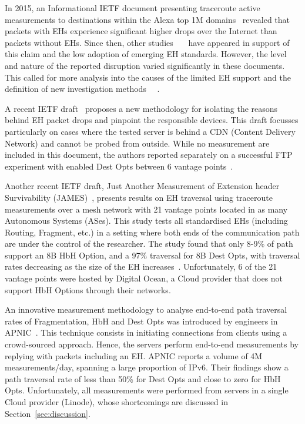 \documentclass[conference]{IEEEtran}
\begin{document}
In 2015, an Informational IETF document presenting traceroute active
measurements to destinations within the Alexa top 1M domains~\cite{RFC7872}
revealed that packets with EHs experience significant higher drops over the
Internet than packets without EHs. Since then, other
studies~\cite{james}~\cite{nalini-iepg114}~\cite{apnic} have appeared in
support of this claim and the low adoption of emerging EH standards.  However,
the level and nature of the reported disruption varied significantly in these
documents.  This called for more analysis into the causes of the limited EH
support and the definition of new investigation methods
~\cite{james}~\cite{elkins-v6ops-eh-deepdive-fw-01}.  

A recent IETF draft~\cite{elkins-v6ops-eh-deepdive-fw-01} proposes a new
methodology for isolating the reasons behind EH packet drops and pinpoint the
responsible devices. This draft focusses particularly on cases where the tested
server is behind a CDN (Content Delivery Network) and cannot be probed from
outside.  While no measurement are included in this document, the authors
reported separately on a successful FTP experiment with enabled Dest Opts
between 6 vantage points~\cite{nalini-iepg114}.

Another recent IETF draft, Just Another Measurement of Extension header
Survivability (JAMES)~\cite{james}, presents results on EH traversal using
traceroute measurements over a mesh network with 21 vantage points located in
as many Autonomous Systems (ASes). This study tests all standardised EHs
(including Routing, Fragment, etc.) in a setting where both ends of the
communication path are under the control of the researcher.  The study found
that only 8-9\% of path support an 8B HbH Option, and a 97\% traversal for 8B
Dest Opts, with traversal rates decreasing as the size of the EH
increases~\cite{james-imc}.  Unfortunately, 6 of the 21 vantage points were
hosted by Digital Ocean\texttrademark, a Cloud provider that does not support
HbH Options through their networks.

An innovative measurement methodology to analyse end-to-end path traversal
rates of Fragmentation, HbH and Dest Opts was introduced by engineers in
APNIC~\cite{apnic}.  This technique consists in initiating connections from
clients using a crowd-sourced approach. Hence, the servers perform end-to-end
measurements by replying with packets including an EH.  APNIC reports a volume
of 4M measurements/day, spanning a large proportion of IPv6. Their findings
show a path traversal rate of less than 50\% for Dest Opts and close to zero
for HbH Opts.  Unfortunately, all measurements were performed from servers in a
single Cloud provider (Linode), whose shortcomings are discussed in
Section~\ref{sec:discussion}. 
\end{document}
